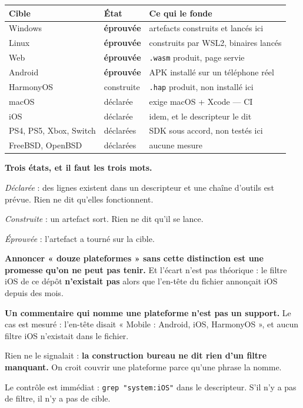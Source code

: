 \begin{center}
\begin{tabular}{@{}lll@{}}
\toprule
\textbf{Cible} & \textbf{État} & \textbf{Ce qui le fonde} \\
\midrule
Windows & \textbf{éprouvée} & artefacts construits et lancés ici \\
Linux & \textbf{éprouvée} & construits par WSL2, binaires lancés \\
Web & \textbf{éprouvée} & \texttt{.wasm} produit, page servie \\
Android & \textbf{éprouvée} & APK installé sur un téléphone réel \\
HarmonyOS & construite & \texttt{.hap} produit, non installé ici \\
macOS & déclarée & exige macOS + Xcode --- CI \\
iOS & déclarée & idem, et le descripteur le dit \\
PS4, PS5, Xbox, Switch & déclarées & SDK sous accord, non testés ici \\
FreeBSD, OpenBSD & déclarées & aucune mesure \\
\bottomrule
\end{tabular}
\end{center}

\begin{nkretenir}
\textbf{Trois états, et il faut les trois mots.}

\emph{Déclarée} : des lignes existent dans un descripteur et une chaîne d'outils
est prévue. Rien ne dit qu'elles fonctionnent.

\emph{Construite} : un artefact sort. Rien ne dit qu'il se lance.

\emph{Éprouvée} : l'artefact a tourné sur la cible.

\textbf{Annoncer « douze plateformes » sans cette distinction est une promesse
qu'on ne peut pas tenir.} Et l'écart n'est pas théorique : le filtre iOS de ce
dépôt \textbf{n'existait pas} alors que l'en-tête du fichier annonçait iOS depuis
des mois.
\end{nkretenir}

\begin{nkpiege}
\textbf{Un commentaire qui nomme une plateforme n'est pas un support.} Le cas est
mesuré : l'en-tête disait « Mobile : Android, iOS, HarmonyOS », et aucun filtre
iOS n'existait dans le fichier.

Rien ne le signalait : \textbf{la construction bureau ne dit rien d'un filtre
manquant.} On croit couvrir une plateforme parce qu'une phrase la nomme.

Le contrôle est immédiat : \texttt{grep "system:iOS"} dans le descripteur. S'il
n'y a pas de filtre, il n'y a pas de cible.
\end{nkpiege}

